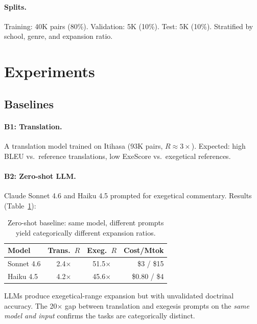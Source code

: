 \documentclass[11pt]{article}
\begin{document}
\paragraph{Splits.}
Training: 40K pairs (80\%). Validation: 5K (10\%). Test: 5K (10\%). Stratified by school, genre, and expansion ratio.


\section{Experiments}
\label{sec:experiments}

\subsection{Baselines}

\paragraph{B1: Translation.}
A translation model trained on Itihasa (93K pairs, $R \approx 3\times$). Expected: high BLEU vs.\ reference translations, low ExeScore vs.\ exegetical references.

\paragraph{B2: Zero-shot LLM.}
Claude Sonnet 4.6 and Haiku 4.5 prompted for exegetical commentary. Results (Table~\ref{tab:zeroshot}):

\begin{table}[t]
\centering
\small
\begin{tabular}{@{}lccr@{}}
\toprule
\textbf{Model} & \textbf{Trans.\ $R$} & \textbf{Exeg.\ $R$} & \textbf{Cost/Mtok} \\
\midrule
Sonnet 4.6 & 2.4$\times$ & 51.5$\times$ & \$3 / \$15 \\
Haiku 4.5 & 4.2$\times$ & 45.6$\times$ & \$0.80 / \$4 \\
\bottomrule
\end{tabular}
\caption{Zero-shot baseline: same model, different prompts yield categorically different expansion ratios.}
\label{tab:zeroshot}
\end{table}

LLMs produce exegetical-range expansion but with unvalidated doctrinal accuracy. The 20$\times$ gap between translation and exegesis prompts on the \textit{same model and input} confirms the tasks are categorically distinct.
\end{document}
